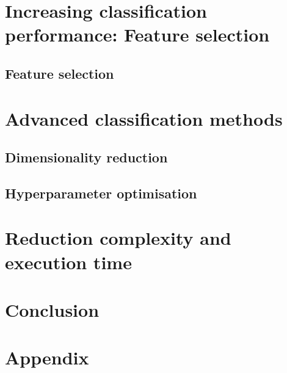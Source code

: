 \documentclass[conference,onecolumn]{IEEEtran}
\begin{document}
\section{Increasing classification performance: Feature selection}
    \subsection{Feature selection}

\section{Advanced classification methods}
    \subsection{Dimensionality reduction}

    \subsection{Hyperparameter optimisation}

\section{Reduction complexity and execution time}
\section{Conclusion}













\newpage
\section*{Appendix}
\end{document}
